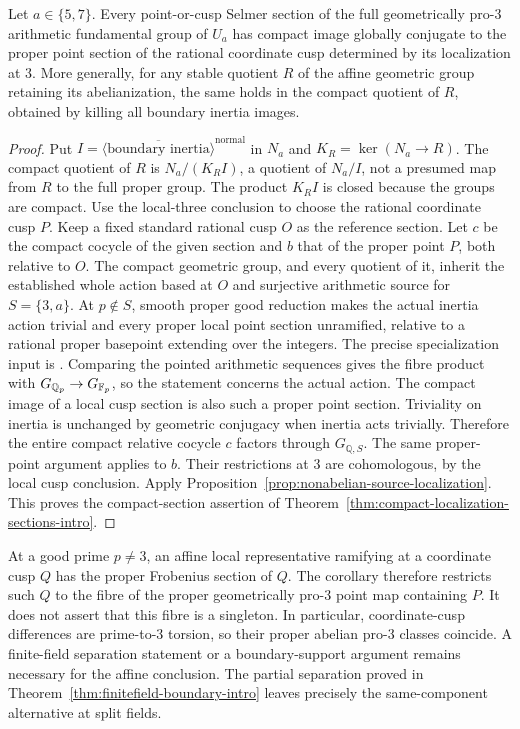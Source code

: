 \begin{corollary}\label{cor:compact-full-base-five-seven}
Let $a\in\{5,7\}$. Every point-or-cusp Selmer section of the full
geometrically pro-$3$ arithmetic fundamental group of $U_a$ has
compact image globally conjugate to the proper point section of the
rational coordinate cusp determined by its localization at $3$.
More generally, for any stable quotient $R$ of the affine geometric
group retaining its abelianization, the same holds in the compact
quotient of $R$, obtained by killing all boundary inertia images.
\end{corollary}
\begin{proof}
Put $I=\overline{\langle\text{boundary inertia}\rangle}^{\mathrm{normal}}$
in $N_a$ and $K_R=\ker(N_a\to R)$. The compact quotient of $R$ is
$N_a/(K_RI)$, a quotient of $N_a/I$, not a presumed map from $R$
to the full proper group. The product $K_RI$ is closed because the
groups are compact.
Use the local-three conclusion to choose the rational coordinate cusp
$P$. Keep a fixed standard rational cusp $O$ as the reference section.
Let $c$ be the compact cocycle of the given section and $b$ that of
the proper point $P$, both relative to $O$. The compact geometric
group, and every quotient of it, inherit the established whole action
based at $O$ and surjective arithmetic source for
$S=\{3,a\}$. At $p\notin S$, smooth proper good reduction makes the
actual inertia action trivial and every proper local point section
unramified, relative to a rational proper basepoint extending over the
integers. The precise specialization input is
\citet[Expos\'e X, Theorem~3.8 and Corollary~3.9, corrected p.~217]{SGA1}.
Comparing the pointed arithmetic sequences gives the fibre product with
$G_{\mathbb Q_p}\to G_{\mathbb F_p}$, so the statement concerns the actual action. The compact image of a local cusp section is also such a
proper point section. Triviality on inertia is unchanged by geometric
conjugacy when inertia acts trivially. Therefore the entire compact
relative cocycle $c$ factors through $G_{\mathbb Q,S}$. The same
proper-point argument applies to $b$. Their restrictions at $3$ are
cohomologous, by the local cusp conclusion. Apply Proposition~\ref{prop:nonabelian-source-localization}. This proves the compact-section assertion of Theorem~\ref{thm:compact-localization-sections-intro}.
\end{proof}

\begin{remark}\label{rem:compact-cusp-frobenius-fibre}
At a good prime $p\ne3$, an affine local representative ramifying at a
coordinate cusp $Q$ has the proper Frobenius section of $Q$.
The corollary therefore restricts such $Q$ to the fibre of the proper
geometrically pro-$3$ point map containing $P$.
It does not assert that this fibre is a singleton. In particular,
coordinate-cusp differences are prime-to-$3$ torsion, so their
proper abelian pro-$3$ classes coincide. A finite-field separation
statement or a boundary-support argument remains necessary for the
affine conclusion. The partial separation proved in
Theorem~\ref{thm:finitefield-boundary-intro} leaves precisely the
same-component alternative at split fields.
\end{remark}
